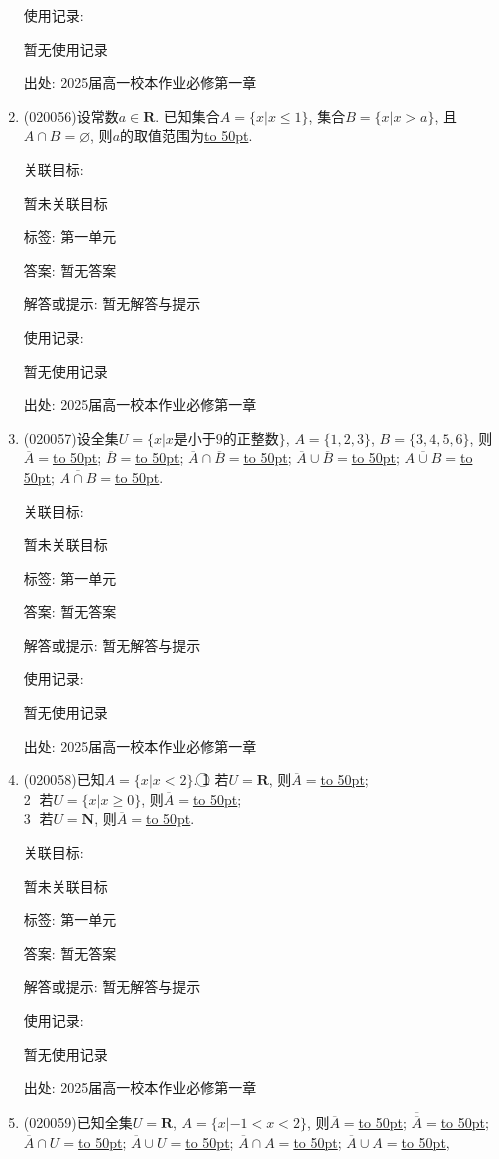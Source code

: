 \documentclass[10pt,a4paper]{article}
\newcommand{\blank}[1]{\underline{\hbox to #1pt{}}}
\begin{document}
\begin{enumerate}[1.]
使用记录:

暂无使用记录


出处: 2025届高一校本作业必修第一章
\item { (020056)}设常数$a\in \mathbf{R}$. 已知集合$A=\{x| x\le 1\}$, 集合$B=\{x| x>a\}$, 且$A\cap B=\varnothing$, 则$a$的取值范围为\blank{50}.


关联目标:

暂未关联目标



标签: 第一单元

答案: 暂无答案

解答或提示: 暂无解答与提示

使用记录:

暂无使用记录


出处: 2025届高一校本作业必修第一章
\item { (020057)}设全集$U=\{x|x\text{是小于}9\text{的正整数}\}$, $A=\{1,2,3\}$, $B=\{3,4,5,6\}$, 则$\overline A=$\blank{50}; $\overline B=$\blank{50}; $\overline A\cap\overline B=$\blank{50}; $
\overline A\cup\overline B=$\blank{50}; $\overline{A\cup B}=$\blank{50}; $\overline{A\cap B}=$\blank{50}.


关联目标:

暂未关联目标



标签: 第一单元

答案: 暂无答案

解答或提示: 暂无解答与提示

使用记录:

暂无使用记录


出处: 2025届高一校本作业必修第一章
\item { (020058)}已知$A=\{x|x<2\}$.
\textcircled{1} 若$U=\mathbf{R}$, 则$\overline A=$\blank{50};\\
\textcircled{2} 若$U=\{x|x\ge 0\}$, 则$\overline A=$\blank{50};\\
\textcircled{3} 若$U= \mathbf{N}$, 则$\overline A=$\blank{50}.


关联目标:

暂未关联目标



标签: 第一单元

答案: 暂无答案

解答或提示: 暂无解答与提示

使用记录:

暂无使用记录


出处: 2025届高一校本作业必修第一章
\item { (020059)}已知全集$U=\mathbf{R}$, $A=\{x|-1<x<2\}$, 则$\overline A=$\blank{50}; $\overline{\overline A}=$\blank{50}; $\overline A\cap U=$\blank{50}; $\overline A\cup U=$\blank{50}; $\overline A\cap A=$\blank{50}; $\overline A\cup A=$\blank{50},



\end{enumerate}
\end{document}
